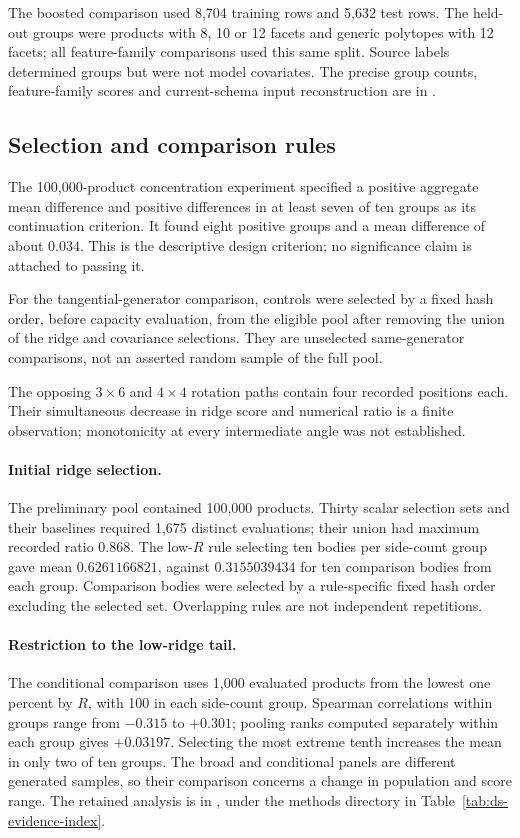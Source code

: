The boosted comparison used 8,704 training rows and 5,632 test rows. The
held-out groups were products with 8, 10 or 12 facets and generic polytopes
with 12 facets; all feature-family comparisons used this same split. Source
labels determined groups but were not model covariates. The precise group
counts, feature-family scores and current-schema input reconstruction are in
.


\subsection{Selection and comparison rules}\label{app:ds-selection}

The 100,000-product concentration experiment specified a positive aggregate
mean difference and positive differences in at least seven of ten groups
as its continuation criterion. It found eight positive groups and a mean
difference of about $0.034$. This is the descriptive design criterion;
no significance claim is attached to passing it.

For the tangential-generator comparison, controls were selected by a fixed
hash order, before capacity evaluation, from the eligible pool after removing
the union of the ridge and covariance selections. They are unselected
same-generator comparisons, not an asserted random sample of the full pool.

The opposing $3\times6$ and $4\times4$ rotation paths contain four recorded
positions each. Their simultaneous decrease in ridge score and numerical
ratio is a finite observation; monotonicity at every intermediate angle
was not established.

\paragraph{Initial ridge selection.}
The preliminary pool contained 100,000 products. Thirty scalar selection
sets and their baselines required 1,675 distinct evaluations; their union
had maximum recorded ratio $0.868$. The low-$R$ rule selecting ten bodies
per side-count group gave mean $0.6261166821$, against $0.3155039434$ for
ten comparison bodies from each group. Comparison bodies were selected by
a rule-specific fixed hash order excluding the selected set. Overlapping
rules are not independent repetitions.

\paragraph{Restriction to the low-ridge tail.}
The conditional comparison uses 1,000 evaluated products from the lowest
one percent by $R$, with 100 in each side-count group. Spearman
correlations within groups range from $-0.315$ to $+0.301$; pooling ranks
computed separately within each group gives $+0.03197$. Selecting the
most extreme tenth increases the mean in only two of ten groups. The
broad and conditional panels are different generated samples, so their
comparison concerns a change in population and score range. The retained
analysis is in ,
under the methods directory in Table~\ref{tab:ds-evidence-index}.

